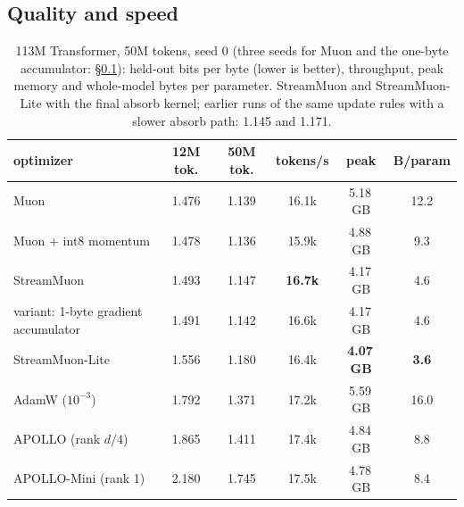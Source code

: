 \documentclass[10pt]{article}
\newcommand{\method}{StreamMuon}\newcommand{\lite}{StreamMuon-Lite}
\begin{document}
\subsection{Quality and speed}
\label{sec:lm}
\begin{table}[!t]
\centering\small
\caption{113M Transformer, 50M tokens, seed 0 (three seeds for Muon and the one-byte accumulator: \S\ref{sec:lm}): held-out bits per byte (lower is better), throughput, peak memory and
whole-model bytes per parameter. \method{} and \lite{} with the final absorb kernel; earlier runs of the same update
rules with a slower absorb path: 1.145 and 1.171.}
\label{tab:lm}
\begin{tabular}{lccccc}
\toprule
optimizer & 12M tok. & 50M tok. & tokens/s & peak & B/param \\
\midrule
Muon & 1.476 & 1.139 & 16.1k & 5.18\,GB & 12.2 \\
Muon + int8 momentum & 1.478 & 1.136 & 15.9k & 4.88\,GB & 9.3 \\
\method{} & 1.493 & 1.147 & \textbf{16.7k} & 4.17\,GB & 4.6 \\
\quad variant: 1-byte gradient accumulator & 1.491 & 1.142 & 16.6k & 4.17\,GB & 4.6 \\
\lite{} & 1.556 & 1.180 & 16.4k & \textbf{4.07\,GB} & \textbf{3.6} \\
AdamW ($10^{-3}$) & 1.792 & 1.371 & 17.2k & 5.59\,GB & 16.0 \\
APOLLO (rank $d/4$) & 1.865 & 1.411 & 17.4k & 4.84\,GB & 8.8 \\
APOLLO-Mini (rank 1) & 2.180 & 1.745 & 17.5k & 4.78\,GB & 8.4 \\
\bottomrule
\end{tabular}
\end{table}
\end{document}
